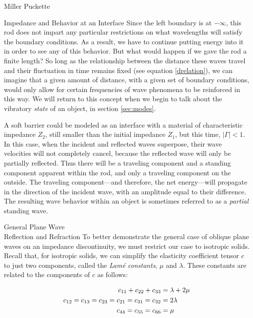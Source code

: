\documentclass[a4paper,10pt]{report}
\numberwithin{equation}{section}
\begin{document}
\begin{chapter}{Miller Puckette}
\begin{section}{Impedance and Behavior at an Interface}
Since the left boundary is at $-\infty$, this rod does not impart any particular restrictions on what wavelengths will satisfy the boundary conditions. As a result, we have to continue putting energy into it in order to see any of this behavior. \cite[p.319]{Cremer1973} But what would happen if we gave the rod a finite length? So long as the relationship between the distance these waves travel and their fluctuation in time 
remains fixed (see equation \eqref{drelation}), we can imagine that a given amount of distance, with a given set of boundary conditions, would only allow for certain frequencies of wave phenomena to be reinforced in this way. We will return to this concept when we begin to talk about the vibratory \emph{state} of an object, in section \ref{sec:modes}.

A soft barrier could be modeled as an interface with a material of characteristic impedance $Z_2$, still smaller than the initial impedance $Z_1$, but this time, $|\Gamma| < 1$. In this case, when the incident and reflected waves superpose, their wave velocities will not completely cancel, because the reflected wave will only be partially reflected. Thus there will be a traveling component and a standing component apparent within the rod, and only a traveling component on the outside. The traveling component---and therefore, the net energy---will propagate in the direction of the incident wave, with an amplitude equal to their difference. The resulting wave behavior within an object is sometimes referred to as a \emph{partial} standing wave. \cite[p.~275]{Hecht1987}

\end{section}

\begin{section}{General Plane Wave \\ Reflection and Refraction}\label{sec:refrac}
To better demonstrate the general case of oblique plane waves on an impedance discontinuity, we must restrict our case to isotropic solids. Recall that, for isotropic solids, we can simplify the elasticity coefficient tensor $c$ to just two components, called the \emph{Lam\'{e} constants}, $\mu$ and $\lambda$. These constants are related to the components of $c$ as follows\cite[p.~95]{Kino1987}:
\begin{singlespace}
\begin{align}\label{lame}
c_{11} + c_{22} + c_{33} &= \lambda + 2\mu \notag\\
c_{12} = c_{13} = c_{23} = c_{21} = c_{31} = c_{32} &= 2\lambda\\
c_{44} = c_{55} = c_{66} &= \mu\notag
\end{align}
\end{singlespace}


\end{section}
\end{chapter}
\end{document}
